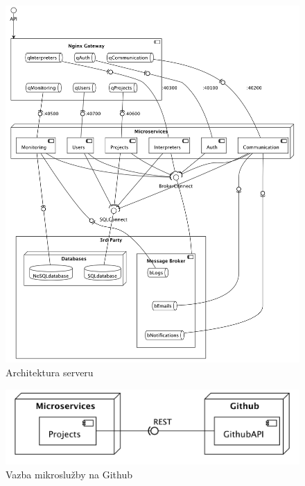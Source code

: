 \begin{figure}[htbp]
   \centering
   \includegraphics[max width=\textwidth]{assets/arch-be}
   \caption{Architektura serveru}\label{fig:server-arch}
\end{figure}

\begin{figure}[htbp]
   \centering
   \includegraphics[max width=\textwidth]{assets/arch-github}
   \caption{Vazba mikroslužby na Github}\label{fig:server-github}
\end{figure}

